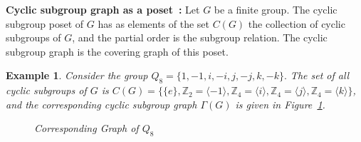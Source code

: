 \documentclass[11pt,twoside]{amsart}
\def \Z {{\mathbb{Z}}}
\newtheorem{ex}[theorem]{Example}
\begin{document}
\textbf{Cyclic subgroup graph as a poset~:}
Let $G$ be a finite group. The cyclic subgroup poset of $G$ has as elements of the set $C(G)$ the collection of cyclic subgroups of $G$, and the partial order is the subgroup relation. The cyclic subgroup graph is the covering graph of this poset.
\begin{ex}\label{example2}
    Consider the group $Q_8=\{1, -1, i, -i, j, -j, k, -k\}.$ The set of all cyclic subgroups of $G$ is $C(G)=\{\{e\}, \Z_2=\langle -1\rangle, \Z_4=\langle i\rangle, \Z_4=\langle j\rangle, \Z_4=\langle k\rangle\}$, and the corresponding cyclic subgroup graph $\Gamma (G)$ is given in Figure~\ref{fig12}.
    \begin{figure}
    \begin{center}

\caption{Corresponding Graph of $Q_8$}
\label{fig:Q8-hasse-diagram}
\end{center}
\label{fig12}   
\end{figure}
\end{ex}
\end{document}
